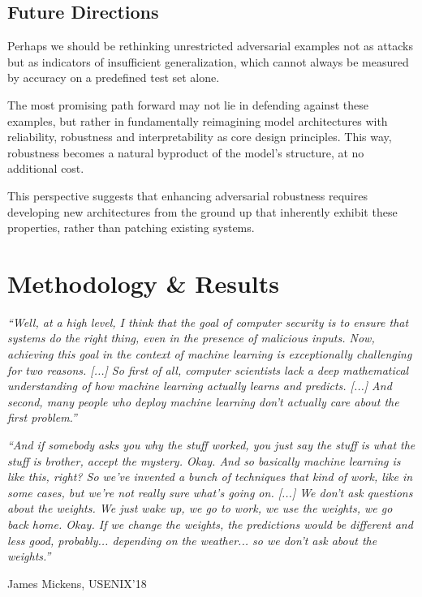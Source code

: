 \documentclass[a4paper, oneside]{discothesis}
\begin{document}
\section{Future Directions}

Perhaps we should be rethinking unrestricted adversarial examples not as attacks but as indicators of insufficient generalization, which cannot always be measured by accuracy on a predefined test set alone.

The most promising path forward may not lie in defending against these examples, but rather in fundamentally reimagining model architectures with reliability, robustness and interpretability as core design principles. This way, robustness becomes a natural byproduct of the model's structure, at no additional cost.

This perspective suggests that enhancing adversarial robustness requires developing new architectures from the ground up that inherently exhibit these properties, rather than patching existing systems.

\chapter{Methodology \& Results}

\begin{quotebox}
	\begin{flushright}
		\textit{``Well, at a high level, I think that the goal of computer security is to ensure that systems do the right thing, even in the presence of malicious inputs. Now, achieving this goal in the context of machine learning is exceptionally challenging for two reasons. [...] So first of all, computer scientists lack a deep mathematical understanding of how machine learning actually learns and predicts. [...] And second, many people who deploy machine learning don't actually care about the first problem.''}
		\vspace{1em}

		\textit{``And if somebody asks you why the stuff worked, you just say the stuff is what the stuff is brother, accept the mystery. Okay. And so basically machine learning is like this, right? So we've invented a bunch of techniques that kind of work, like in some cases, but we're not really sure what's going on. [...] We don't ask questions about the weights. We just wake up, we go to work, we use the weights, we go back home. Okay. If we change the weights, the predictions would be different and less good, probably... depending on the weather... so we don't ask about the weights.''}
		\vspace{1em}

		\textemdash{} James Mickens, USENIX'18~\cite{218395}
	\end{flushright}
\end{quotebox}
\end{document}
